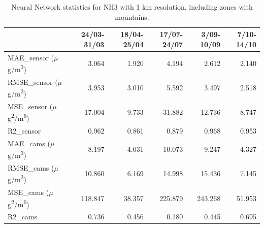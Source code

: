 \begin{table}[H]
\begin{tabular}{lrrrrr}
\toprule
 &  24/03-31/03 &  18/04-25/04 &  17/07-24/07 &  3/09-10/09 &  7/10-14/10 \\
\midrule
 MAE\_sensor ($\mu$g/m\textsuperscript{3})&        3.064 &        1.920 &        4.194 &       2.612 &       2.140 \\
RMSE\_sensor ($\mu$g/m\textsuperscript{3})&        3.953 &        3.010 &        5.592 &       3.497 &       2.518 \\
 MSE\_sensor ($\mu$g\textsuperscript{2}/m\textsuperscript{6})&       17.004 &        9.733 &       31.882 &      12.736 &       8.747 \\
  R2\_sensor &        0.962 &        0.861 &        0.879 &       0.968 &       0.953 \\
   MAE\_cams ($\mu$g/m\textsuperscript{3})&        8.197 &        4.031 &       10.073 &       9.247 &       4.327 \\
  RMSE\_cams ($\mu$g/m\textsuperscript{3})&       10.860 &        6.169 &       14.998 &      15.436 &       7.145 \\
   MSE\_cams ($\mu$g\textsuperscript{2}/m\textsuperscript{6})&      118.847 &       38.357 &      225.879 &     243.268 &      51.953 \\
    R2\_cams &        0.736 &        0.456 &        0.180 &       0.445 &       0.695 \\
\bottomrule
\end{tabular}
\caption{Neural Network statistics for NH3 with 1 km resolution, including zones with mountains.}
\end{table}



